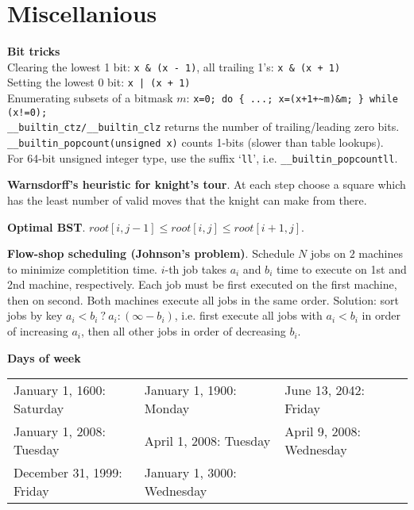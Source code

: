 \documentclass[a4paper, 12pt]{article}
\let\le=\leqslant
\newcommand{\Section}[1]{
  \section*{#1}
  \addcontentsline{toc}{subsection}{#1}
  \vspace{-3mm}
}
\newcommand{\Topic}[1]{\textbf{#1}}
\begin{document}
\Section{Miscellanious}

\Topic{Bit tricks} \\
Clearing the lowest 1 bit: \verb$x & (x - 1)$, all trailing 1's: \verb$x & (x + 1)$ \\
Setting the lowest 0 bit: \verb$x | (x + 1)$ \\
Enumerating subsets of a bitmask $m$:
\verb|x=0; do { ...; x=(x+1+~m)&m; } while (x!=0);| \\
\verb$__builtin_ctz/__builtin_clz$ returns the number of trailing/leading zero bits. \\
\verb$__builtin_popcount(unsigned x)$ counts 1-bits (slower than table lookups). \\
For 64-bit unsigned integer type, use the suffix `\verb$ll$', i.e. \verb$__builtin_popcountll$.





\Topic{Warnsdorff's heuristic for knight's tour}.
At each step choose a square which has the least number of valid moves
that the knight can make from there.

\Topic{Optimal BST}. $root[i, j-1] \le root[i, j] \le root[i+1, j]$.

\Topic{Flow-shop scheduling (Johnson's problem)}.
Schedule $N$ jobs on $2$ machines to minimize completition time.
$i$-th job takes $a_i$ and $b_i$ time to execute on 1st and 2nd machine, respectively.
Each job must be first executed on the first machine, then on second.
Both machines execute all jobs in the same order.
Solution: sort jobs by key $a_i < b_i\ ?\ a_i : (\infty - b_i)$,
i.e. first execute all jobs with $a_i < b_i$ in order of increasing $a_i$,
then all other jobs in order of decreasing $b_i$.

\Topic{Days of week} \\
\begin{tabular}{l l l}
  January 1, 1600: Saturday &
  January 1, 1900: Monday   &
  June 13, 2042: Friday     \\
  January 1, 2008: Tuesday  &
  April 1, 2008: Tuesday    &
  April 9, 2008: Wednesday  \\
  December 31, 1999: Friday & January 1, 3000: Wednesday
\end{tabular}



\newpage
\end{document}
